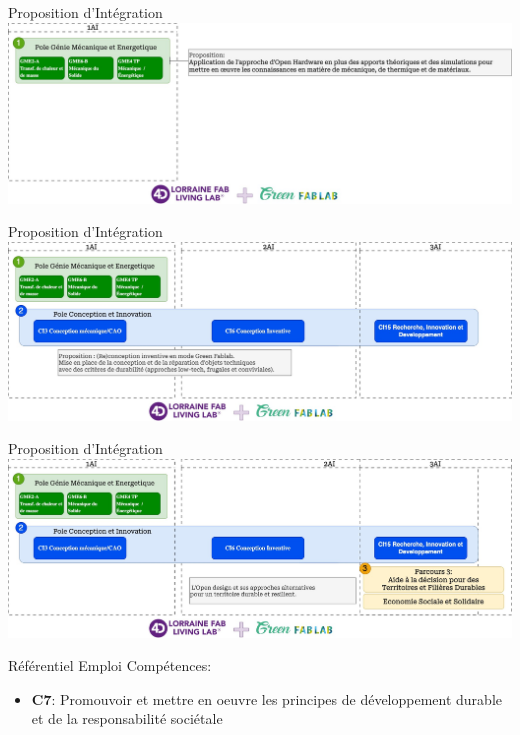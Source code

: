\documentclass[
  11pt,
  ignorenonframetext,
  aspectratio=169,
  c]{beamer}
\providecommand{\tightlist}{%
  \setlength{\itemsep}{0pt}\setlength{\parskip}{0pt}}\usepackage{longtable,booktabs,array}
\begin{document}
\begin{frame}[t]{Proposition d'Intégration}
\protect\hypertarget{proposition-dintuxe9gration-1}{}
\includegraphics{Figures/slides/Ensegnement-Integration-01.jpg}
\end{frame}

\begin{frame}[t]{Proposition d'Intégration}
\protect\hypertarget{proposition-dintuxe9gration-2}{}
\includegraphics{Figures/slides/Ensegnement-Integration-02.jpg}
\end{frame}

\begin{frame}[t]{Proposition d'Intégration}
\protect\hypertarget{proposition-dintuxe9gration-3}{}
\includegraphics{Figures/slides/Ensegnement-Integration-03.jpg}

\vspace{-5pt}
\small

Référentiel Emploi Compétences:

\vspace{-3pt}

\begin{itemize}
\tightlist
\item
  \textbf{C7}: \footnotesize Promouvoir et mettre en oeuvre les
  principes de développement durable et de la responsabilité sociétale
\end{itemize}
\end{frame}
\end{document}
